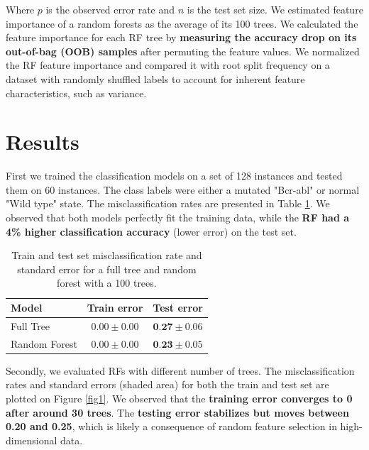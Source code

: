 \documentclass[fleqn,moreauthors,10pt]{ds_report}
\begin{document}
Where $p$ is the observed error rate and $n$ is the test set size. We estimated feature importance of a random forests as the average of its 100 trees. We calculated the feature importance for each RF tree by \textbf{measuring the accuracy drop on its out-of-bag (OOB) samples} after permuting the feature values. We normalized the RF feature importance and compared it with root split frequency on a dataset with randomly shuffled labels to account for inherent feature characteristics, such as variance.


\section*{Results}

First we trained the classification models on a set of 128 instances and tested them on 60 instances. The class labels were either a mutated "Bcr-abl" or normal "Wild type" state. The misclassification rates are presented in Table \ref{tab1}. We observed that both models perfectly fit the training data, while the \textbf{RF had a 4\% higher classification accuracy} (lower error) on the test set.

\begin{table}[h!]
    \centering
    \begin{tabular}{lcc}
        \toprule
        \textbf{Model} & \textbf{Train error} & \textbf{Test error} \\
        \midrule
        Full Tree       & $0.00 \pm 0.00$ & $\textbf{0.27} \pm 0.06$ \\
        Random Forest   & $0.00 \pm 0.00$ & $\textbf{0.23} \pm 0.05$ \\
        \bottomrule
    \end{tabular}
    \vspace{0.5em}
    \caption{Train and test set misclassification rate and standard error for a full tree and random forest with a 100 trees.}
    \label{tab1}
\end{table}

Secondly, we evaluated RFs with different number of trees. The misclassification rates and standard errors (shaded area) for both the train and test set are plotted on Figure \ref{fig1}. We observed that the \textbf{training error converges to 0 after around 30 trees}. The \textbf{testing error stabilizes but moves between 0.20 and 0.25}, which is likely a consequence of random feature selection in high-dimensional data.
\end{document}
